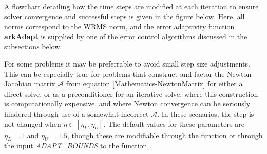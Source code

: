\documentclass[letterpaper,10pt,english]{sphinxmanual}
\begin{document}
A flowchart detailing how the time steps are modified at each
iteration to ensure solver convergence and successful steps is given
in the figure below.  Here, all norms correspond to the WRMS norm, and
the error adaptivity function \textbf{arkAdapt} is supplied by one of the
error control algorithms discussed in the subsections below.
\begin{figure}[htbp]
\centering

\label{Mathematics:adaptivity-figure}\end{figure}

For some problems it may be preferrable to avoid small step size
adjustments.  This can be especially true for problems that construct
and factor the Newton Jacobian matrix \({\mathcal A}\) from
equation \eqref{Mathematics-NewtonMatrix} for either a direct solve, or as a
preconditioner for an iterative solve, where this construction is
computationally expensive, and where Newton convergence can be
seriously hindered through use of a somewhat incorrect
\({\mathcal A}\).  In these scenarios, the step is not changed
when \(\eta \in [\eta_L, \eta_U]\).  The default values for these
parameters are \(\eta_L = 1\) and \(\eta_U = 1.5\), though
these are modifiable through the function
{\hyperref[c_interface/User_callable:c.ARKodeSetFixedStepBounds]{\emph{}}} or through the input
\emph{ADAPT\_BOUNDS} to the function {\hyperref[f_interface/Usage:f/_/FARKSETRIN]{\emph{}}}.
\end{document}
